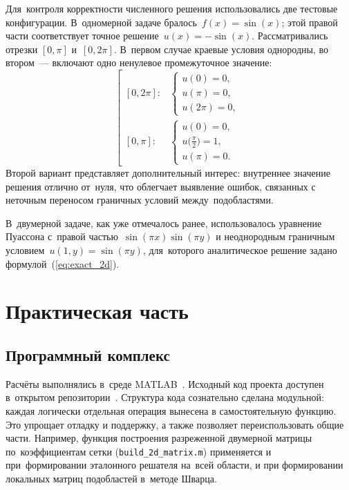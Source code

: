 Для~контроля корректности численного решения использовались две тестовые
конфигурации. В~одномерной задаче бралось~$f(x)=\sin(x)$; этой правой части
соответствует точное решение~$u(x)=-\sin(x)$. Рассматривались отрезки
$[0,\pi]$ и~$[0,2\pi]$. В~первом случае краевые условия однородны, во
втором~--- включают одно ненулевое промежуточное значение:
\begin{equation}\label{eq:test_bc}
	\left[\begin{array}{ll}
		\displaystyle[0,2\pi]: &
		\begin{cases}
			u(0)=0,   \\
			u(\pi)=0, \\
			u(2\pi)=0,
		\end{cases}             \\[20pt]
		\displaystyle[0,\pi]:  &
		\begin{cases}
			u(0)=0,                        \\
			u\bigl(\tfrac{\pi}{2}\bigr)=1, \\
			u(\pi)=0.
		\end{cases}
	\end{array}\right.
\end{equation}
Второй вариант представляет дополнительный интерес: внутреннее значение
решения отлично от~нуля, что облегчает выявление ошибок, связанных с
неточным переносом граничных условий между~подобластями.

В~двумерной задаче, как уже отмечалось ранее, использовалось уравнение
Пуассона с~правой частью~$\sin(\pi x)\sin(\pi y)$ и неоднородным граничным
условием~$u(1,y)=\sin(\pi y)$, для~которого аналитическое решение задано
формулой~(\ref{eq:exact_2d}).

\section{Практическая часть}

\subsection{Программный комплекс}

Расчёты выполнялись в~среде MATLAB~\cite{matlab2023}. Исходный код проекта
доступен в~открытом репозитории~\cite{schwartz_github}. Структура кода сознательно
сделана модульной: каждая логически отдельная операция вынесена в
самостоятельную функцию. Это упрощает отладку и поддержку, а также позволяет
переиспользовать общие части. Например, функция построения разреженной
двумерной матрицы по~коэффициентам сетки (\lstinline|build_2d_matrix.m|)
применяется и при~формировании эталонного решателя на~всей области, и при
формировании локальных матриц подобластей в~методе Шварца.

